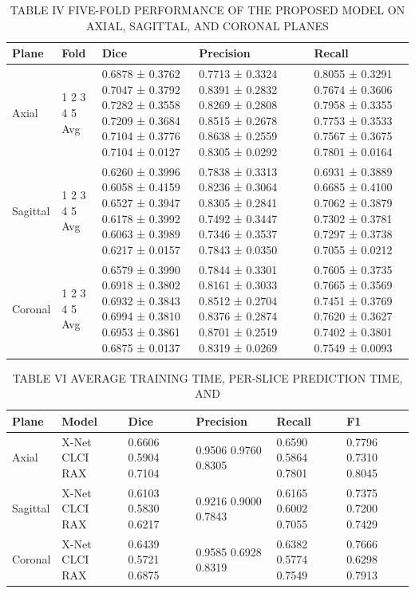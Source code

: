 \begin{table}[htbp]
\centering
\caption{TABLE IV FIVE-FOLD PERFORMANCE OF THE PROPOSED MODEL ON AXIAL, SAGITTAL, AND CORONAL PLANES}
\label{tab:table\_004}
\begin{tabular}{lllll}
\hline
Plane & Fold & Dice & Precision & Recall \\
\hline
Axial & 1 2 3 4 5 Avg & 0.6878 ± 0.3762 0.7047 ± 0.3792 0.7282 ± 0.3558 0.7209 ± 0.3684 0.7104 ± 0.3776 0.7104 ± 0.0127 & 0.7713 ± 0.3324 0.8391 ± 0.2832 0.8269 ± 0.2808 0.8515 ± 0.2678 0.8638 ± 0.2559 0.8305 ± 0.0292 & 0.8055 ± 0.3291 0.7674 ± 0.3606 0.7958 ± 0.3355 0.7753 ± 0.3533 0.7567 ± 0.3675 0.7801 ± 0.0164 \\
Sagittal & 1 2 3 4 5 Avg & 0.6260 ± 0.3996 0.6058 ± 0.4159 0.6527 ± 0.3947 0.6178 ± 0.3992 0.6063 ± 0.3989 0.6217 ± 0.0157 & 0.7838 ± 0.3313 0.8236 ± 0.3064 0.8305 ± 0.2841 0.7492 ± 0.3447 0.7346 ± 0.3537 0.7843 ± 0.0350 & 0.6931 ± 0.3889 0.6685 ± 0.4100 0.7062 ± 0.3879 0.7302 ± 0.3781 0.7297 ± 0.3738 0.7055 ± 0.0212 \\
Coronal & 1 2 3 4 5 Avg & 0.6579 ± 0.3990 0.6918 ± 0.3802 0.6932 ± 0.3843 0.6994 ± 0.3810 0.6953 ± 0.3861 0.6875 ± 0.0137 & 0.7844 ± 0.3301 0.8161 ± 0.3033 0.8512 ± 0.2704 0.8376 ± 0.2874 0.8701 ± 0.2519 0.8319 ± 0.0269 & 0.7605 ± 0.3735 0.7665 ± 0.3569 0.7451 ± 0.3769 0.7620 ± 0.3627 0.7402 ± 0.3801 0.7549 ± 0.0093 \\
\hline
\end{tabular}
\end{table}

\begin{table}[htbp]
\centering
\caption{TABLE VI AVERAGE TRAINING TIME, PER-SLICE PREDICTION TIME, AND}
\label{tab:table\_005}
\begin{tabular}{llllll}
\hline
Plane & Model & Dice & Precision & Recall & F1 \\
\hline
Axial & X-Net CLCI RAX & 0.6606 0.5904 0.7104 & 0.9506 0.9760 0.8305 & 0.6590 0.5864 0.7801 & 0.7796 0.7310 0.8045 \\
Sagittal & X-Net CLCI RAX & 0.6103 0.5830 0.6217 & 0.9216 0.9000 0.7843 & 0.6165 0.6002 0.7055 & 0.7375 0.7200 0.7429 \\
Coronal & X-Net CLCI RAX & 0.6439 0.5721 0.6875 & 0.9585 0.6928 0.8319 & 0.6382 0.5774 0.7549 & 0.7666 0.6298 0.7913 \\
\hline
\end{tabular}
\end{table}

